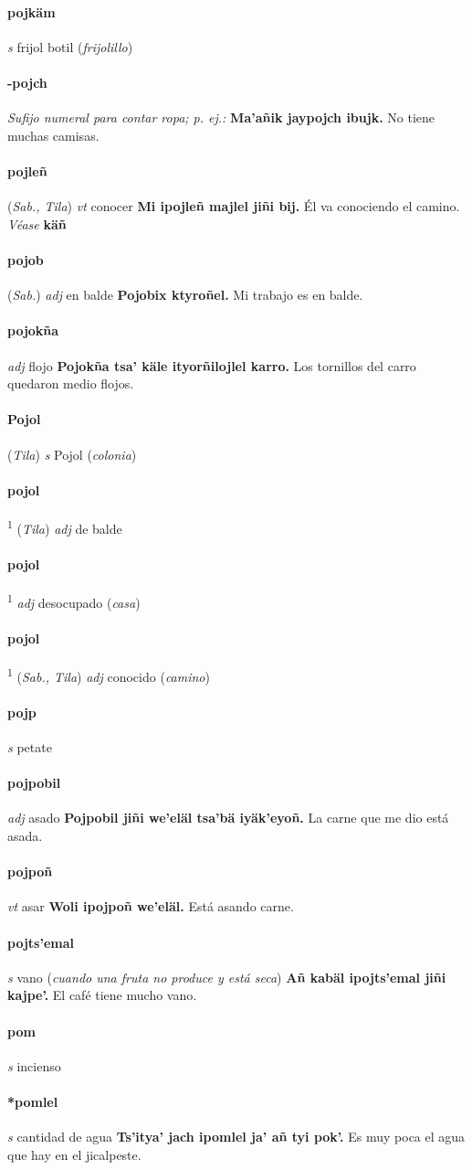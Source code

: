 \documentclass{scrbook}
\newcommand{\entry}[1]{\paragraph{#1}}
\newcommand{\defsuperscript}[1]{\textsuperscript{1}}
\newcommand{\nontranslationdef}[1]{\textit{#1}}
\newcommand{\partofspeech}[1]{\textit{#1}}
\newcommand{\spanishtranslation}[1]{#1}
\newcommand{\clarification}[1]{(\textit{#1})}
\newcommand{\cholexample}[1]{\textbf{#1}}
\newcommand{\exampletranslation}[1]{#1}
\newcommand{\alsosee}[1]{\\\textit{Véase} \textbf{#1}}
\newcommand{\relevantdialect}[1]{(\textit{#1})}
\begin{document}
\begin{multicols}{2}
\entry{pojkäm}
\partofspeech{s}
\spanishtranslation{frijol botil}
\clarification{frijolillo}

\entry{-pojch}
\nontranslationdef{Sufijo numeral para contar ropa; p. ej.:}
\cholexample{Ma'añik jaypojch ibujk.}
\exampletranslation{No tiene muchas camisas.}

\entry{pojleñ}
\relevantdialect{Sab., Tila}
\partofspeech{vt}
\spanishtranslation{conocer}
\cholexample{Mi ipojleñ majlel jiñi bij.}
\exampletranslation{Él va conociendo el camino.}
\alsosee{käñ}

\entry{pojob}
\relevantdialect{Sab.}
\partofspeech{adj}
\spanishtranslation{en balde}
\cholexample{Pojobix ktyroñel.}
\exampletranslation{Mi trabajo es en balde.}

\entry{pojokña}
\partofspeech{adj}
\spanishtranslation{flojo}
\cholexample{Pojokña tsa' käle ityorñilojlel karro.}
\exampletranslation{Los tornillos del carro quedaron medio flojos.}

\entry{Pojol}
\relevantdialect{Tila}
\partofspeech{s}
\spanishtranslation{Pojol}
\clarification{colonia}

\entry{pojol}
\defsuperscript{3}
\relevantdialect{Tila}
\partofspeech{adj}
\spanishtranslation{de balde}

\entry{pojol}
\defsuperscript{1}
\partofspeech{adj}
\spanishtranslation{desocupado}
\clarification{casa}

\entry{pojol}
\defsuperscript{2}
\relevantdialect{Sab., Tila}
\partofspeech{adj}
\spanishtranslation{conocido}
\clarification{camino}

\entry{pojp}
\partofspeech{s}
\spanishtranslation{petate}

\entry{pojpobil}
\partofspeech{adj}
\spanishtranslation{asado}
\cholexample{Pojpobil jiñi we'eläl tsa'bä iyäk'eyoñ.}
\exampletranslation{La carne que me dio está asada.}

\entry{pojpoñ}
\partofspeech{vt}
\spanishtranslation{asar}
\cholexample{Woli ipojpoñ we'eläl.}
\exampletranslation{Está asando carne.}

\entry{pojts'emal}
\partofspeech{s}
\spanishtranslation{vano}
\clarification{cuando una fruta no produce y está seca}
\cholexample{Añ kabäl ipojts'emal jiñi kajpe'.}
\exampletranslation{El café tiene mucho vano.}

\entry{pom}
\partofspeech{s}
\spanishtranslation{incienso}

\entry{*pomlel}
\partofspeech{s}
\spanishtranslation{cantidad de agua}
\cholexample{Ts'itya' jach ipomlel ja' añ tyi pok'.}
\exampletranslation{Es muy poca el agua que hay en el jicalpeste.}


\end{multicols}
\end{document}

